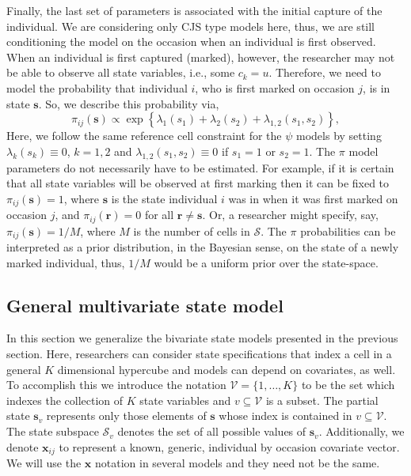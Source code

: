 \documentclass[sts]{imsart}
\numberwithin{equation}{section}
\theoremstyle{plain}
\newcommand{\bs}{\ensuremath{\mathbf{s}}}
\newcommand{\fS}{\ensuremath{\mathcal{S}}}
\newcommand{\br}{\ensuremath{\mathbf{r}}}
\newcommand{\fV}{\ensuremath{\mathcal{V}}}
\newcommand{\bx}{\ensuremath{\mathbf{x}}}
\begin{document}
Finally, the last set of parameters is associated with the initial capture of the individual. We are considering only CJS type models here, thus, we are still conditioning the model on the occasion when an individual is first observed. When an individual is first captured (marked), however, the researcher may not be able to observe all state variables, i.e., some $c_k = u$. Therefore, we need to model the probability that individual $i$, who is first marked on occasion $j$, is in state $\bs$. So, we describe this probability via,
\begin{equation}
\pi_{ij}(\bs) \propto \exp\left\{\lambda_1(s_1) + \lambda_2(s_2) + \lambda_{1,2}(s_1,s_2)\right\}, 
\end{equation}
Here, we follow the same reference cell constraint for the $\psi$ models by setting $\lambda_k(s_k)\equiv 0$, $k=1,2$ and $\lambda_{1,2}(s_1,s_2)\equiv 0$ if $s_1=1$ or $s_2=1$. The $\pi$ model parameters do not necessarily have to be estimated. For example, if it is certain that all state variables will be observed at first marking then it can be fixed to $\pi_{ij}(\bs) = 1$, where $\bs$ is the state individual $i$ was in when it was first marked on occasion $j$, and $\pi_{ij}(\br) = 0$ for all $\br\ne\bs$. Or, a researcher might specify, say, $\pi_{ij}(\bs) = 1/M$, where $M$ is the number of cells in $\fS$. The $\pi$ probabilities can be interpreted as a prior distribution, in the Bayesian sense, on the state of a newly marked individual, thus, $1/M$ would be a uniform prior over the state-space.
 
\subsection{General multivariate state model}

In this section we generalize the bivariate state models presented in the previous section. Here, researchers can consider state specifications that index a cell in a general $K$ dimensional hypercube and models can depend on covariates, as well. To accomplish this we introduce the notation $\fV = \{1,\dots,K\}$ to be the set which indexes the collection of $K$ state variables and $v\subseteq\fV$ is a subset. The partial state $\bs_v$ represents only those elements of $\bs$ whose index is contained in $v\subseteq\fV$. The state subspace $\fS_v$ denotes the set of all possible values of $\bs_v$. Additionally, we denote $\bx_{ij}$ to represent a known, generic, individual by occasion covariate vector. We will use the $\bx$ notation in several models and they need not be the same.
\end{document}
